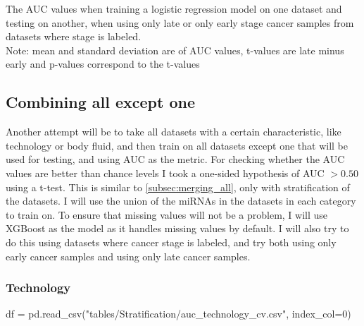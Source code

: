 {{{{{{{{{{\begin{table}
    \caption{The AUC values when training a logistic regression model on one dataset and testing on another, when using only late or only early stage cancer samples from datasets where stage is labeled.\\
    Note: mean and standard deviation are of AUC values, t-values are late minus early and p-values correspond to the t-values}
    \label{tab:strat_pairs_stages}
    \begin{center}
    \end{center}
\end{table}

\subsection{Combining all except one}
\label{subsec:res_strat_all}
Another attempt will be to take all datasets with a certain characteristic, like technology or body fluid, and then train on all datasets except one that will be used for testing, and using AUC as the metric. For checking whether the AUC values are better than chance levels I took a one-sided hypothesis of AUC $> 0.50$ using a t-test. This is similar to \autoref{subsec:merging_all}, only with stratification of the datasets. I will use the union of the miRNAs in the datasets in each category to train on. To ensure that missing values will not be a problem, I will use XGBoost as the model as it handles missing values by default. I will also try to do this using datasets where cancer stage is labeled, and try both using only early cancer samples and using only late cancer samples.

\subsubsection{Technology}
\label{subsec:res_strat_all_technology}
\begin{pycode}
df = pd.read_csv("tables/Stratification/auc_technology_cv.csv", index_col=0)
\end{pycode}

}}}}}}}}}}
